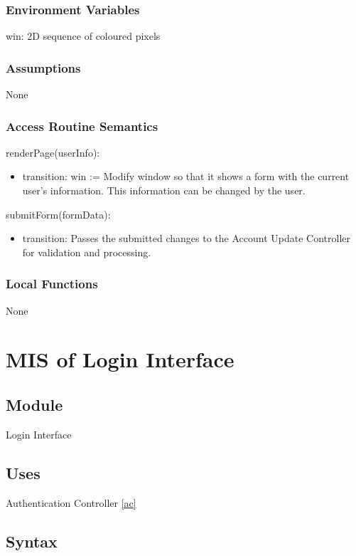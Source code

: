 \documentclass[12pt, titlepage]{article}
\begin{document}
\subsubsection{Environment Variables}
win: 2D sequence of coloured pixels

\subsubsection{Assumptions}
None

\subsubsection{Access Routine Semantics}

\noindent renderPage(userInfo):
\begin{itemize}
\item transition: win := Modify window so that it shows a form with the current user's information. This information can be changed by the user.
\end{itemize}

\noindent submitForm(formData):
\begin{itemize}
\item transition: Passes the submitted changes to the Account Update Controller for validation and processing.
\end{itemize}

\subsubsection{Local Functions}
None

\section{MIS of Login Interface} \label{li}

\subsection{Module}

Login Interface

\subsection{Uses}

Authentication Controller \ref{ac}

\subsection{Syntax}
\end{document}
